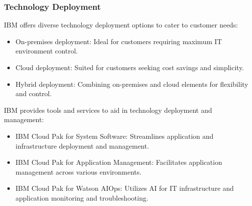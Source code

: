 \subsubsection{Technology Deployment}

IBM offers diverse technology deployment options to cater to customer needs:

\begin{itemize}
    \item On-premises deployment: Ideal for customers requiring maximum IT environment control.
    \item Cloud deployment: Suited for customers seeking cost savings and simplicity.
    \item Hybrid deployment: Combining on-premises and cloud elements for flexibility and control.
\end{itemize}

IBM provides tools and services to aid in technology deployment and management:

\begin{itemize}
    \item IBM Cloud Pak for System Software: Streamlines application and infrastructure deployment and management.
    \item IBM Cloud Pak for Application Management: Facilitates application management across various environments.
    \item IBM Cloud Pak for Watson AIOps: Utilizes AI for IT infrastructure and application monitoring and troubleshooting.
\end{itemize}

